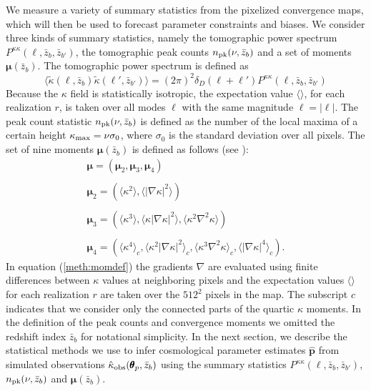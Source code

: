 \documentclass[reprint,aps,prd,superscriptaddress,showkeys,showpacs]{revtex4-1}
\newcommand{\bbh}[1]{\mathbf{\hat{#1}}}
\newcommand{\h}[1]{\hat{#1}}
\begin{document}
We measure a variety of summary statistics from the pixelized convergence maps, which will then be used to forecast parameter constraints and biases. We consider three kinds of summary statistics, namely the tomographic power spectrum $P^{\kappa\kappa}(\ell,\bar{z}_b,\bar{z}_{b'})$, the tomographic peak counts $n_{\rm pk}(\nu,\bar{z}_b)$ and a set of moments $\pmb{\mu}(\bar{z}_b)$. The tomographic power spectrum is defined as 
\begin{equation}
\langle\tilde{\kappa}(\pmb{\ell},\bar{z}_b)\tilde{\kappa}(\pmb{\ell}',\bar{z}_{b'})\rangle = (2\pi)^2\delta_D(\pmb{\ell}+\pmb{\ell}')P^{\kappa\kappa}(\ell,\bar{z}_b,\bar{z}_{b'})
\end{equation}
%
Because the $\kappa$ field is statistically isotropic, the expectation value $\langle\rangle$, for each realization $r$, is taken over all modes $\pmb{\ell}$ with the same magnitude $\ell=\vert\pmb{\ell}\vert$. The peak count statistic $n_{\rm pk}(\nu,\bar{z}_b)$ is defined as the number of the local maxima of a certain height $\kappa_{\rm max}=\nu\sigma_0$, where $\sigma_0$ is the standard deviation over all pixels. The set of nine moments $\pmb{\mu}(\bar{z}_b)$ is defined as follows (see \citep{Matsubara10,Munshi12,MinkPetri}): 
%
\begin{equation}
\label{meth:momdef}
\begin{matrix}
\pmb{\mu} = (\pmb{\mu}_2,\pmb{\mu}_3,\pmb{\mu}_4) \\ \\
\pmb{\mu}_2 = (\langle\kappa^2\rangle,\langle\vert\nabla\kappa\vert^2\rangle) \\ \\
\pmb{\mu}_3 = (\langle\kappa^3\rangle,\langle\kappa\vert\nabla\kappa\vert^2\rangle,\langle\kappa^2\nabla^2\kappa\rangle) \\ \\
\pmb{\mu}_4 = (\langle\kappa^4\rangle_c,\langle\kappa^2\vert\nabla\kappa\vert^2\rangle_c,\langle\kappa^3\nabla^2\kappa\rangle_c,\langle\vert\nabla\kappa\vert^4\rangle_c) .
\end{matrix}
\end{equation}
%
In equation (\ref{meth:momdef}) the gradients $\nabla$ are evaluated using finite differences between $\kappa$ values at neighboring pixels and the expectation values $\langle\rangle$ for each realization $r$ are taken over the $512^2$ pixels in the map. The subscript $c$ indicates that we consider only the connected parts of the quartic $\kappa$ moments. In the definition of the peak counts and convergence moments we omitted the redshift index $\bar{z}_b$ for notational simplicity. In the next section, we describe the statistical methods we use to infer cosmological parameter estimates $\bbh{p}$ from simulated observations $\h{\kappa}_{\rm obs}(\pmb{\theta}_p,\bar{z}_b)$ using the summary statistics $P^{\kappa\kappa}(\ell,\bar{z}_b,\bar{z}_{b'})$, $n_{\rm pk}(\nu,\bar{z}_b)$ and $\pmb{\mu}(\bar{z}_b)$.   
\end{document}
